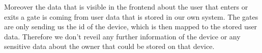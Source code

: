 Moreover the data that is visible in the frontend about the user that enters or exits a gate is coming from user data that is stored in our own system. The gates are only sending us the id of the device, which is then mapped to the stored user data. Therefore we don't reveil any further information of the device or any sensitive data about the owner that could be stored on that device.

\clearpage